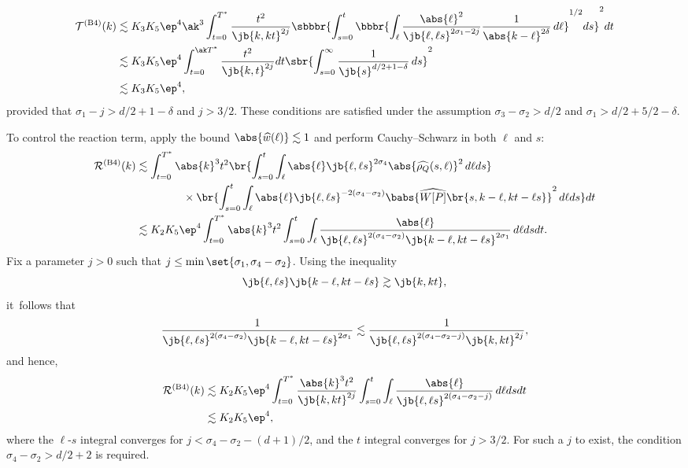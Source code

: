 \begin{align*}
\mathcal{T}^{\mathrm{(B4)}}(k)&\lesssim K_3K_5\ep^4\ak^3\int_{t=0}^{T^*}\frac{t^2}{\jb{k,kt}^{2j}}\sbbbr{\int_{s=0}^t\bbbr{\int_\ell\frac{\abs{\ell}^2}{\jb{\ell,\ell s}^{2\sigma_1-2j}}\frac{1}{\abs{k-\ell}^{2\delta}}\,d\ell}^{1/2} ds}^2dt\\
&\lesssim K_3K_5\ep^4\int_{t=0}^{\ak T^*}\frac{t^2}{\jb{k,t}^{2j}}dt\sbr{\int_{s=0}^\infty\frac{1}{\jb{s}^{{d/2}+1-\delta}} \,ds}^2\\
&\lesssim K_3K_5\ep^4,
\end{align*}provided that $\sigma_1-j>d/2+1-\delta$ and $j>3/2$. These conditions are satisfied under the assumption $\sigma_3-\sigma_2>d/2$ and $\sigma_1>d/2+5/2-\delta$.

To control the reaction term, apply the bound $\abs{\widehat w(\ell)}\lesssim1$ and perform Cauchy--Schwarz in both $\ell$ and $s$:
\begin{align*}
\mathcal{R}^{\mathrm{(B4)}}(k)&\lesssim \int_{t=0}^{T^*}\abs{k}^3t^2\br{\int_{s=0}^t\int_\ell\abs{\ell}\jb{\ell,\ell s}^{2\sigma_4}\abs{\widehat{\rho_Q}(s,\ell)}^2\,d\ell ds}\\ &\hspace{1.5cm}\times\br{\int_{s=0}^t\int_\ell\abs{\ell}\jb{\ell,\ell s}^{-2(\sigma_4-\sigma_2)}\babs{\widehat {W[P]}\br{s,k-\ell,kt-\ell s}}^2\,d\ell ds}dt\\
&\lesssim K_2K_5 \ep^4\int_{t=0}^{T^*}\abs{k}^3t^2\int_{s=0}^t\int_\ell \frac{\abs{\ell}}{\jb{\ell,\ell s}^{2(\sigma_4-\sigma_2)}\jb{k-\ell,kt-\ell s}^{2\sigma_1}}\,d\ell dsdt.
\end{align*}Fix a parameter $j>0$ such that $j\leq \min\set{\sigma_1,\sigma_4-\sigma_2}$. Using the inequality
\[
\jb{\ell,\ell s}\jb{k-\ell,kt-\ell s}\gtrsim\jb{k,k t},
\]
it~follows that
\begin{align*}
\frac{1}{\jb{\ell,\ell s}^{2(\sigma_4-\sigma_2)}\jb{k-\ell,kt-\ell s}^{2\sigma_1}}\lesssim\frac{1}{\jb{\ell,\ell s}^{2(\sigma_4-\sigma_2-j)}\jb{k,kt}^{2j}},
\end{align*}
and hence,
\begin{align*}
\mathcal{R}^{\mathrm{(B4)}}(k)&\lesssim K_2K_5 \ep^4\int_{t=0}^{T^*}\frac{\abs{k}^3t^2}{\jb{k,kt}^{2j}}\int_{s=0}^t\int_\ell \frac{\abs{\ell}}{\jb{\ell,\ell s}^{2(\sigma_4-\sigma_2-j)}}\,d\ell dsdt \\
&\lesssim K_2K_5 \ep^4,
\end{align*}where the $\ell$-$s$ integral converges for $j<\sigma_4-\sigma_2-(d+1)/2$, and the $t$ integral converges for $j>3/2$. For such a $j$ to exist, the condition $\sigma_4-\sigma_2>d/2+2$ is required.

